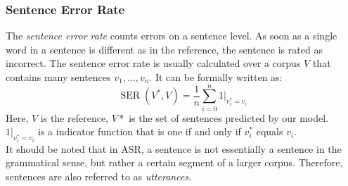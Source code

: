 \subsubsection{Sentence Error Rate}
The \textit{sentence error rate} counts errors on a sentence level. As soon as a single word in a sentence is different as in the reference, the sentence is rated as incorrect. The sentence error rate is usually calculated over a corpus $V$ that contains many sentences $v_1,...,v_n$. It can be formally written as:
\[
\operatorname{SER}(V^*, V) = \frac{1}{n} \sum_{i = 0}^n 1|_{v^*_i = v_i} 
\]
Here, $V$ is the reference, $V*$ is the set of sentences predicted by our model. $1|_{v^*_i = v_i}$ is a indicator function that is one if and only if $v^*_i$ equals $v_i$. \\
It should be noted that in ASR, a sentence is not essentially a sentence in the grammatical sense, but rather a certain segment of a larger corpus. Therefore, sentences are also referred to as \textit{utterances}. 